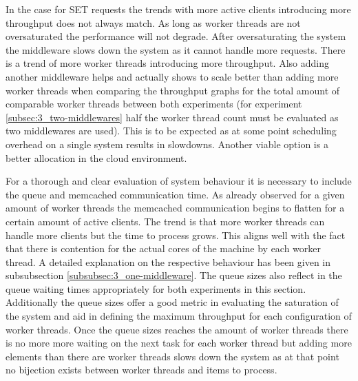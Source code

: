         In the case for SET requests the trends with more active clients introducing more throughput does not always
        match. As long as worker threads are not oversaturated the performance will not degrade. After oversaturating
        the system the middleware slows down the system as it cannot handle more requests. There is a trend of more
        worker threads introducing more throughput. Also adding another middleware helps and actually shows to scale
        better than adding more worker threads when comparing the throughput graphs for the total amount of comparable
        worker threads between both experiments (for experiment \ref{subsec:3_two-middlewares} half the worker thread
        count must be evaluated as two middlewares are used). This is to be expected as at some point scheduling
        overhead on a single system results in slowdowns. Another viable option is a better allocation in the cloud
        environment.

        For a thorough and clear evaluation of system behaviour it is necessary to include the queue and memcached
        communication time.\newline
        As already observed for a given amount of worker threads the memcached communication begins to flatten for a
        certain amount of active clients. The trend is that more worker threads can handle more clients but the time to
        process grows. This aligns well with the fact that there is contention for the actual cores of the machine by
        each worker thread. A detailed explanation on the respective behaviour has been given in
        subsubsection \ref{subsubsec:3_one-middleware}. The queue sizes also reflect in the queue waiting times
        appropriately for both experiments in this section. Additionally the queue sizes offer a good metric in
        evaluating the saturation of the system and aid in defining the maximum throughput for each configuration of
        worker threads. Once the queue sizes reaches the amount of worker threads there is no more more waiting on the
        next task for each worker thread but adding more elements than there are worker threads slows down the system as
        at that point no bijection exists between worker threads and items to process.


